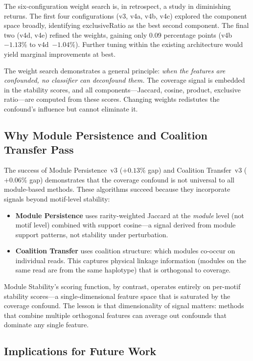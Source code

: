 \documentclass{../yalumba}
\begin{document}
The six-configuration weight search is, in retrospect, a study in diminishing
returns.  The first four configurations (v3, v4a, v4b, v4c) explored the
component space broadly, identifying exclusiveRatio as the best second
component.  The final two (v4d, v4e) refined the weights, gaining only 0.09
percentage points (v4b~$-1.13\%$ to v4d~$-1.04\%$).  Further tuning within
the existing architecture would yield marginal improvements at best.

The weight search demonstrates a general principle: \emph{when the features
are confounded, no classifier can deconfound them.}  The coverage signal is
embedded in the stability scores, and all components---Jaccard, cosine,
product, exclusive ratio---are computed from these scores.  Changing weights
redistutes the confound's influence but cannot eliminate it.

\subsection{Why Module Persistence and Coalition Transfer Pass}

The success of Module Persistence~v3 ($+0.13\%$ gap) and Coalition
Transfer~v3 ($+0.06\%$ gap) demonstrates that the coverage confound is not
universal to all module-based methods.  These algorithms succeed because they
incorporate signals beyond motif-level stability:

\begin{itemize}
  \item \textbf{Module Persistence} uses rarity-weighted Jaccard at the
    \emph{module} level (not motif level) combined with support cosine---a
    signal derived from module support patterns, not stability under
    perturbation.
  \item \textbf{Coalition Transfer} uses coalition structure: which modules
    co-occur on individual reads.  This captures physical linkage information
    (modules on the same read are from the same haplotype) that is orthogonal
    to coverage.
\end{itemize}

Module Stability's scoring function, by contrast, operates entirely on
per-motif stability scores---a single-dimensional feature space that is
saturated by the coverage confound.  The lesson is that dimensionality of
signal matters: methods that combine multiple orthogonal features can
average out confounds that dominate any single feature.

\subsection{Implications for Future Work}
\end{document}
